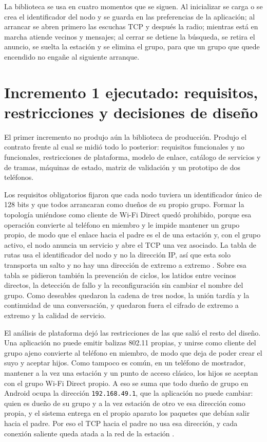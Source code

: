 \documentclass[12pt,oneside]{scrreprt}
\begin{document}
La biblioteca se usa en cuatro momentos que se siguen. Al inicializar se carga o se crea el identificador del nodo y se guarda en las preferencias de la aplicación; al arrancar se abren primero las escuchas TCP y después la radio; mientras está en marcha atiende vecinos y mensajes; al cerrar se detiene la búsqueda, se retira el anuncio, se suelta la estación y se elimina el grupo, para que un grupo que quede encendido no engañe al siguiente arranque.

\section{Incremento 1 ejecutado: requisitos, restricciones y decisiones de diseño}

El primer incremento no produjo aún la biblioteca de producción. Produjo el contrato frente al cual se midió todo lo posterior: requisitos funcionales y no funcionales, restricciones de plataforma, modelo de enlace, catálogo de servicios y de tramas, máquinas de estado, matriz de validación y un prototipo de dos teléfonos.

Los requisitos obligatorios fijaron que cada nodo tuviera un identificador único de 128 bits y que todos arrancaran como dueños de su propio grupo. Formar la topología uniéndose como cliente de Wi-Fi Direct quedó prohibido, porque esa operación convierte al teléfono en miembro y le impide mantener un grupo propio, de modo que el enlace hacia el padre es el de una estación y, con el grupo activo, el nodo anuncia un servicio y abre el TCP una vez asociado. La tabla de rutas usa el identificador del nodo y no la dirección IP, así que esta solo transporta un salto y no hay una dirección de extremo a extremo \parencite{Tanenbaum2011}. Sobre esa tabla se pidieron también la prevención de ciclos, los latidos entre vecinos directos, la detección de fallo y la reconfiguración sin cambiar el nombre del grupo. Como deseables quedaron la cadena de tres nodos, la unión tardía y la continuidad de una conversación, y quedaron fuera el cifrado de extremo a extremo y la calidad de servicio.

El análisis de plataforma dejó las restricciones de las que salió el resto del diseño. Una aplicación no puede emitir balizas 802.11 propias, y unirse como cliente del grupo ajeno convierte al teléfono en miembro, de modo que deja de poder crear el suyo y aceptar hijos. Como tampoco es común, en un teléfono de mostrador, mantener a la vez una estación y un punto de acceso clásico, los hijos se aceptan con el grupo Wi-Fi Direct propio. A eso se suma que todo dueño de grupo en Android ocupa la dirección \texttt{192.168.49.1}, que la aplicación no puede cambiar: quien es dueño de su grupo y a la vez estación de otro ve esa dirección como propia, y el sistema entrega en el propio aparato los paquetes que debían salir hacia el padre. Por eso el TCP hacia el padre no usa esa dirección, y cada conexión saliente queda atada a la red de la estación \parencite{AndroidDevelopers2024}.
\end{document}
